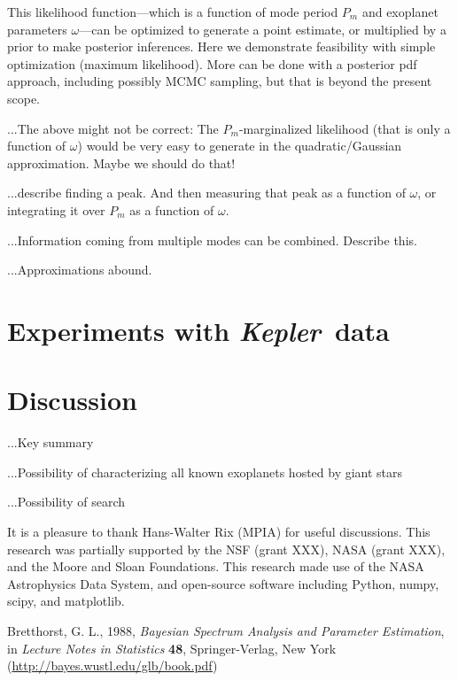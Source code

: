 \documentclass[12pt, preprint]{aastex}
\newcommand{\project}[1]{\textsl{#1}}
\newcommand{\Kepler}{\project{Kepler}}
\begin{document}
This likelihood function---which is a function of mode period $P_m$
and exoplanet parameters $\omega$---can be optimized to generate a
point estimate, or multiplied by a prior to make posterior inferences.
Here we demonstrate feasibility with simple optimization (maximum
likelihood).
More can be done with a posterior pdf approach, including possibly
MCMC sampling, but that is beyond the present scope.

...The above might not be correct: The $P_m$-marginalized likelihood
(that is only a function of $\omega$) would be very easy to generate
in the quadratic/Gaussian approximation.  Maybe we should do that!

...describe finding a peak.  And then measuring that peak as a
function of $\omega$, or integrating it over $P_m$ as a function of
$\omega$.

...Information coming from multiple modes can be combined.  Describe
this.

...Approximations abound.

\section{Experiments with \Kepler\ data}

\section{Discussion}

...Key summary

...Possibility of characterizing all known exoplanets hosted by giant stars

...Possibility of search

\acknowledgements
It is a pleasure to thank
  Hans-Walter Rix (MPIA)
for useful discussions.
This research was partially supported by the NSF (grant XXX), NASA
(grant XXX), and the Moore and Sloan Foundations.
This research made use of the NASA Astrophysics Data System, and
open-source software including Python, numpy, scipy, and matplotlib.

\begin{thebibliography}{}\raggedright
{}
  Bretthorst, G. L., 1988,
  \textit{Bayesian Spectrum Analysis and Parameter Estimation},
  in \textit{Lecture Notes in Statistics} \textbf{48},
  Springer-Verlag, New York
  \footnotesize{(\url{http://bayes.wustl.edu/glb/book.pdf})}
\end{thebibliography}
\end{document}
